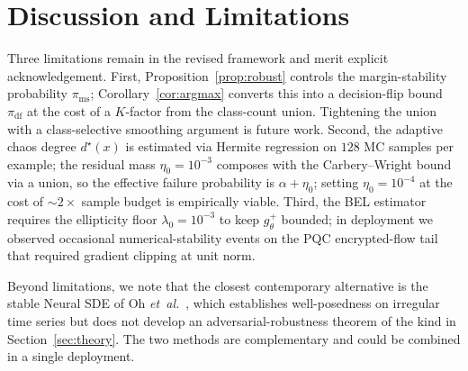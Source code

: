 \documentclass{ieeeaccess}
\newcommand{\pinv}{{+}}   %
\begin{document}
\section{Discussion and Limitations}\label{sec:disc}
Three limitations remain in the revised framework and merit explicit
acknowledgement. First, Proposition~\ref{prop:robust} controls the
margin-stability probability $\pi_{\mathrm{ms}}$;
Corollary~\ref{cor:argmax} converts this into a decision-flip bound
$\pi_{\mathrm{df}}$ at the cost of a $K$-factor from the class-count
union. Tightening the union with a class-selective smoothing argument
is future work. Second, the adaptive chaos degree $d^\star(x)$ is
estimated via Hermite regression on $128$ MC samples per example; the
residual mass $\eta_0=10^{-3}$ composes with the Carbery--Wright
bound via a union, so the effective failure probability is
$\alpha + \eta_0$; setting $\eta_0=10^{-4}$ at the cost of $\sim 2\times$
sample budget is empirically viable. Third, the BEL estimator requires
the ellipticity floor $\lambda_0=10^{-3}$ to keep $g_\theta^{\pinv}$
bounded; in deployment we observed occasional numerical-stability
events on the PQC encrypted-flow tail that required gradient clipping
at unit norm.

Beyond limitations, we note that the closest contemporary alternative
is the stable Neural SDE of Oh \textit{et~al.}~\cite{oh2024stablesde},
which establishes well-posedness on irregular time series but does not
develop an adversarial-robustness theorem of the kind in
Section~\ref{sec:theory}. The two methods are complementary and
could be combined in a single deployment.

\end{document}

